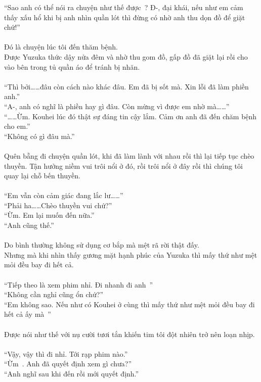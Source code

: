 \documentclass[12pt,a4paper, twosides]{book}
\begin{document}
“Sao anh có thể nói ra chuyện như thế được~? Đ-, đại khái, nếu như em cảm thấy xấu hổ khi bị anh nhìn quần lót thì đừng có nhờ anh thu dọn đồ để giặt chứ!”\\
\\
Đó là chuyện lúc tôi đến thăm bệnh.\\
Được Yuzuka thức dậy nửa đêm và nhờ thu gom đồ, gấp đồ đã giặt lại rồi cho vào bên trong tủ quần áo để tránh bị nhăn.\\
\\
“Thì bởi……đâu còn cách nào khác đâu. Em đã bị sốt mà. Xin lỗi đã làm phiền anh.”\\
“A-, anh có nghĩ là phiền hay gì đâu. Còn mừng vì được em nhờ mà……”\\
“……Ừm. Kouhei lúc đó thật sự đáng tin cậy lắm. Cảm ơn anh đã đến chăm bệnh cho em.”\\
“Không có gì đâu mà.”\\
\\
Quên bẵng đi chuyện quần lót, khi đã làm lành với nhau rồi thì lại tiếp tục chèo thuyền. Tận hưởng niềm vui trôi nổi ở đó, rồi trôi nổi ở đây rồi thì chúng tôi quay lại chỗ bến thuyền.\\
\\
“Em vẫn còn cảm giác đang lắc lư……”\\
“Phải ha……Chèo thuyền vui chứ?”\\
“Ừm. Em lại muốn đến nữa.”\\
“Anh cũng thế.”\\
\\
Do bình thường không sử dụng cơ bắp mà mệt rã rời thật đấy.\\
Nhưng mà khi nhìn thấy gương mặt hạnh phúc của Yuzuka thì mấy thứ như mệt mỏi đều bay đi hết cả.\\
\\
“Tiếp theo là xem phim nhỉ. Đi nhanh đi anh~”\\
“Không cần nghỉ cũng ổn chứ?”\\
“Em không sao. Nếu như có Kouhei ở cùng thì mấy thứ như mệt mỏi đều bay đi hết cả ấy mà~”\\
\\
Được nói như thế với nụ cười tươi tắn khiến tim tôi đột nhiên trở nên loạn nhịp.\\
\\
“Vậy, vậy thì đi nhỉ. Tới rạp phim nào.”\\
“Ừm~. Anh đã quyết định xem gì chưa?”\\
“Anh nghĩ sau khi đến rồi mới quyết định.”\\
\end{document}
